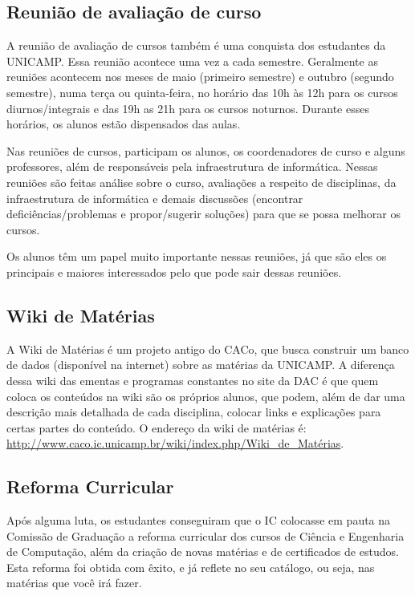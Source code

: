 \documentclass[a4paper,10pt]{article}
\begin{document}
\subsection{Reunião de avaliação de curso}
A reunião de avaliação de cursos também é uma conquista dos estudantes da
UNICAMP. Essa reunião acontece uma vez a cada semestre. Geralmente as reuniões
acontecem nos meses de maio (primeiro semestre) e outubro (segundo semestre),
numa terça ou quinta-feira, no horário das 10h às 12h para os cursos
diurnos/integrais e das 19h as 21h para os cursos noturnos. Durante esses
horários, os alunos estão dispensados das aulas.

Nas reuniões de cursos, participam os alunos, os coordenadores de curso e alguns
professores, além de responsáveis pela infraestrutura de informática. Nessas
reuniões são feitas análise sobre o curso, avaliações a respeito de disciplinas,
da infraestrutura de informática e demais discussões (encontrar
deficiências/problemas e propor/sugerir soluções) para que se possa melhorar os
cursos.

Os alunos têm um papel muito importante nessas reuniões, já que são eles os
principais e maiores interessados pelo que pode sair dessas reuniões.

\subsection{Wiki de Matérias}
A Wiki de Matérias é um projeto antigo do CACo, que busca construir um banco de
dados (disponível na internet) sobre as matérias da UNICAMP. A diferença dessa
wiki das ementas e programas constantes no site da DAC é que quem coloca os
conteúdos na wiki são os próprios alunos, que podem, além de dar uma descrição
mais detalhada de cada disciplina, colocar links e explicações para certas
partes do conteúdo. O endereço da wiki de matérias é:
\url{http://www.caco.ic.unicamp.br/wiki/index.php/Wiki_de_Matérias}.

\subsection{Reforma Curricular}
Após alguma luta, os estudantes conseguiram que o IC colocasse em pauta na
Comissão de Graduação a reforma curricular dos cursos de Ciência e Engenharia de
Computação, além da criação de novas matérias e de certificados de estudos. Esta
reforma foi obtida com êxito, e já reflete no seu catálogo, ou seja, nas
matérias que você irá fazer.
\end{document}
